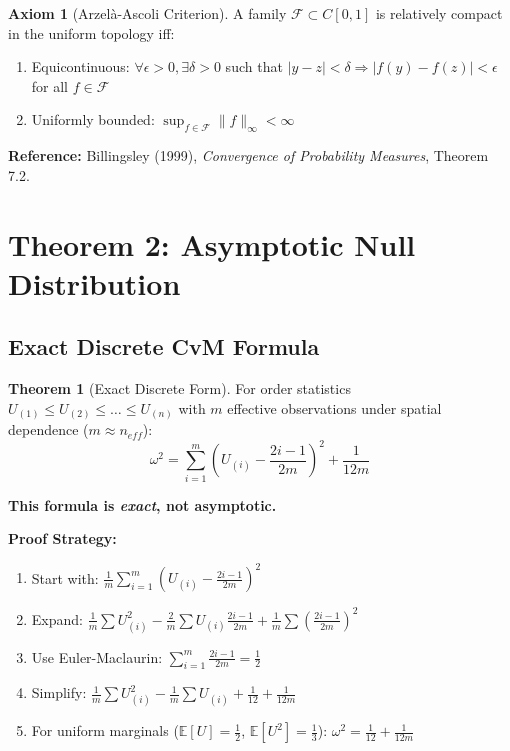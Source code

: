 \documentclass[11pt,a4paper]{amsart}
\theoremstyle{definition}
\newtheorem{theorem}{Theorem}[section]
\newtheorem{axiom}{Axiom}[section]
\newcommand{\E}{\mathbb{E}}
\begin{document}
\begin{axiom}[Arzel\`{a}-Ascoli Criterion]
\label{ax:arzela}
A family $\mathcal{F} \subset C[0,1]$ is relatively compact in the uniform topology iff:
\begin{enumerate}
\item Equicontinuous: $\forall \epsilon > 0, \exists \delta > 0$ such that 
$|y-z| < \delta \Rightarrow |f(y)-f(z)| < \epsilon$ for all $f \in \mathcal{F}$
\item Uniformly bounded: $\sup_{f \in \mathcal{F}} \|f\|_\infty < \infty$
\end{enumerate}

\textbf{Reference:} Billingsley (1999), \textit{Convergence of Probability Measures}, 
Theorem 7.2.
\end{axiom}

\section{Theorem 2: Asymptotic Null Distribution}
\label{sec:theorem2}

\subsection{Exact Discrete CvM Formula}

\begin{theorem}[Exact Discrete Form]
\label{thm:exact-discrete}
For order statistics $U_{(1)} \leq U_{(2)} \leq \dots \leq U_{(n)}$ with 
$m$ effective observations under spatial dependence ($m \approx n_{eff}$):
\begin{equation*}
\omega^2 = \sum_{i=1}^m \left(U_{(i)} - \frac{2i-1}{2m}\right)^2 + \frac{1}{12m}
\end{equation*}

\textbf{This formula is \emph{exact}, not asymptotic.}

\textbf{Proof Strategy:}
\begin{enumerate}
\item Start with: $\frac{1}{m} \sum_{i=1}^m \left(U_{(i)} - \frac{2i-1}{2m}\right)^2$
\item Expand: $\frac{1}{m}\sum U_{(i)}^2 - \frac{2}{m}\sum U_{(i)}\frac{2i-1}{2m} + \frac{1}{m}\sum\left(\frac{2i-1}{2m}\right)^2$
\item Use Euler-Maclaurin: $\sum_{i=1}^m \frac{2i-1}{2m} = \frac{1}{2}$
\item Simplify: $\frac{1}{m}\sum U_{(i)}^2 - \frac{1}{m}\sum U_{(i)} + \frac{1}{12} + \frac{1}{12m}$
\item For uniform marginals ($\E[U]=\frac{1}{2}$, $\E[U^2]=\frac{1}{3}$): $\omega^2 = \frac{1}{12} + \frac{1}{12m}$
\end{enumerate}
\end{theorem}
\end{document}

